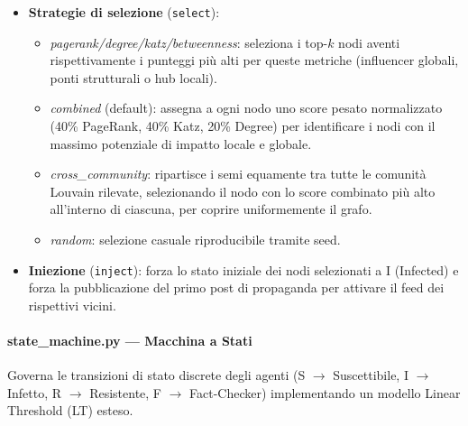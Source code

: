 \documentclass[11pt, a4paper]{article}
\begin{document}
\begin{itemize}[leftmargin=*]
    \item \textbf{Strategie di selezione} (\texttt{select}):
    \begin{itemize}
        \item \textit{pagerank/degree/katz/betweenness}: seleziona i top-$k$ nodi aventi rispettivamente i punteggi più alti per queste metriche (influencer globali, ponti strutturali o hub locali).
        \item \textit{combined} (default): assegna a ogni nodo uno score pesato normalizzato (40\% PageRank, 40\% Katz, 20\% Degree) per identificare i nodi con il massimo potenziale di impatto locale e globale.
        \item \textit{cross\_community}: ripartisce i semi equamente tra tutte le comunità Louvain rilevate, selezionando il nodo con lo score combinato più alto all'interno di ciascuna, per coprire uniformemente il grafo.
        \item \textit{random}: selezione casuale riproducibile tramite seed.
    \end{itemize}
    \item \textbf{Iniezione} (\texttt{inject}): forza lo stato iniziale dei nodi selezionati a I (Infected) e forza la pubblicazione del primo post di propaganda per attivare il feed dei rispettivi vicini.
\end{itemize}

\paragraph{state\_machine.py — Macchina a Stati}
Governa le transizioni di stato discrete degli agenti (S $\to$ Suscettibile, I $\to$ Infetto, R $\to$ Resistente, F $\to$ Fact-Checker) implementando un modello Linear Threshold (LT) esteso.
\end{document}
